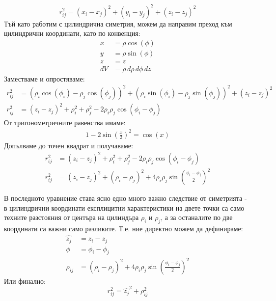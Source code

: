 \begin{equation}
	r_{ij}^2 = (x_{i} - x_{j})^2  + (y_{i} - y_{j})^2 + (z_{i}-z_{j})^2
	\label{eq:cartesian}
\end{equation}
Тъй като работим с цилиндрична симетрия, можем да направим преход към цилиндрични координати, като по конвенция:
\begin{align*}
	x  & = \rho \cos(\phi)           \\
	y  & = \rho \sin(\phi)           \\
	z  & = z                         \\
	dV & = \rho \,d\rho \,d\phi \,dz 
\end{align*}
Заместваме и опростяваме:
\begin{align*}
	r_{ij}^2 & = (\rho_{i}\cos(\phi_{i}) - \rho_{j}\cos(\phi_{j}))^2 + (\rho_{i}\sin(\phi_{i}) - \rho_{j}\sin(\phi_{j}))^2 + (z_i - z_j)^2 \\
	r_{ij}^2 & = (z_i - z_j)^2 + \rho_{i}^2 + \rho_{j}^2 - 2\rho_{i}\rho_{j}\cos{(\phi_i - \phi_j)}                                        
\end{align*}
От тригонометричните равенства имаме:
\begin{align*}
	1-2 \sin{\left(\frac{x}{2}\right)}^2=\cos (x) 
\end{align*}
Допълваме до точен квадрат и получаваме:
\begin{align*}
	r_{ij}^2 & = (z_i - z_j)^2 + \rho_{i}^2 + \rho_{j}^2 - 2\rho_{i}\rho_{j}\cos{(\phi_i - \phi_j)}                    \\
	r_{ij}^2 & = (z_i - z_j)^2  + (\rho_i - \rho_j)^2 + 4 \rho_i \rho_j \sin{\left( \frac{\phi_i-\phi_j}{2} \right)}^2 
\end{align*}

В последното уравнение става ясно едно много важно следствие от симетрията - в цилиндрични координати експлицитни характеристики на двете точки са само техните разстояния от центъра на 
цилиндъра $\rho_{i}$ и $\rho_j$, а за останалите по две координати са важни само разликите. Т.е. ние директно можем да дефинираме:
\begin{align*}
	\hat{z_j} & = z_i - z_j                                                                            \\
	\phi      & = \phi_i - \phi_j                                                                      \\
	\rho_{ij} & = (\rho_i - \rho_j)^2 + 4 \rho_i \rho_j \sin{\left( \frac{\phi_i-\phi_j}{2} \right)}^2 
\end{align*}
Или финално:
\begin{equation}
	\label{eq:cylindricalcoords}
	r_{ij}^2 =  \hat{z_{j}}^2 + \rho_{ij}^2
\end{equation}

